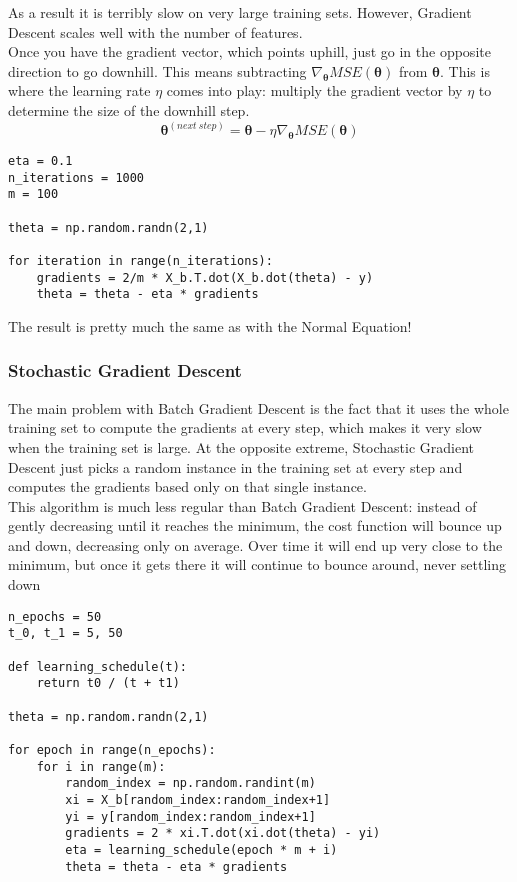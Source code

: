 \documentclass[french]{article}
\begin{document}
As a result it is terribly slow on very large training sets. However, Gradient Descent scales well with the number of features.\\

Once you have the gradient vector, which points uphill, just go in the opposite direction to go downhill. This means subtracting $\nabla_{\bm{\theta}}MSE(\bm{\theta})$ from $\bm{\theta}$. This is where the learning rate $\eta$ comes into play: multiply the gradient vector by $\eta$ to determine the size of the downhill step.
\[\bm{\theta}^{(next\ step)} = \bm{\theta} - \eta \nabla_{\bm{\theta}}MSE(\bm{\theta})\]

\begin{lstlisting}
eta = 0.1
n_iterations = 1000
m = 100

theta = np.random.randn(2,1)

for iteration in range(n_iterations):
    gradients = 2/m * X_b.T.dot(X_b.dot(theta) - y)
    theta = theta - eta * gradients
\end{lstlisting}

The result is pretty much the same as with the Normal Equation!

\subsubsection{Stochastic Gradient Descent}

The main problem with Batch Gradient Descent is the fact that it uses the whole training set to compute the gradients at every step, which makes it very slow when the training set is large. At the opposite extreme, Stochastic Gradient Descent just picks a random instance in the training set at every step and computes the gradients based only on that single instance.\\

This algorithm is much less regular than Batch Gradient Descent: instead of gently decreasing until it reaches the minimum, the cost function will bounce up and down, decreasing only on average. Over time it will end up very close to the minimum, but once it gets there it will continue to bounce around, never settling down

\begin{lstlisting}
n_epochs = 50
t_0, t_1 = 5, 50

def learning_schedule(t):
    return t0 / (t + t1)

theta = np.random.randn(2,1)

for epoch in range(n_epochs):
    for i in range(m):
        random_index = np.random.randint(m)
        xi = X_b[random_index:random_index+1]
        yi = y[random_index:random_index+1]
        gradients = 2 * xi.T.dot(xi.dot(theta) - yi)
        eta = learning_schedule(epoch * m + i)
        theta = theta - eta * gradients
\end{lstlisting}
\end{document}
